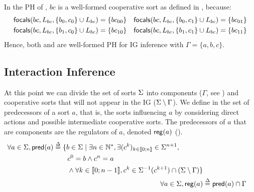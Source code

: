 \begin{example}
In the PH of , $bc$ is a well-formed cooperative sort as defined in , because:
\begin{align*}
\mathsf{focals}(bc, L_{bc}, \{b_0, c_0\} \cup L_{bc}) = \{bc_{00}\} && \mathsf{focals}(bc, L_{bc}, \{b_0, c_1\} \cup L_{bc}) = \{bc_{01}\} \\
\mathsf{focals}(bc, L_{bc}, \{b_1, c_0\} \cup L_{bc}) = \{bc_{10}\} && \mathsf{focals}(bc, L_{bc}, \{b_1, c_1\} \cup L_{bc}) = \{bc_{11}\}
\end{align*}
Hence, both  and  are well-formed PH for IG inference
with $\Gamma = \{a,b,c\}$.
\end{example}



\subsection{Interaction Inference}\label{ssec:infer-IG}

At this point we can divide the set of sorts $\Sigma$ into components ($\Gamma$, see ) and cooperative sorts
that will not appear in the IG ($\Sigma \setminus \Gamma$).
We define in  the set of predecessors of a sort $a$, that is, the sorts influencing $a$
by considering direct actions and possible intermediate cooperative sorts.
The predecessors of $a$ that are components are the regulators of $a$, denoted $\mathsf{reg}({a})$
().
\begin{align}
\begin{split}
\forall a \in \Sigma, \mathsf{pred}(a) &\stackrel{\Delta}= \{b \in \Sigma \mid \exists n \in \mathbb{N}^*, \exists
(c^k)_{k \in \llbracket 0 ; n \rrbracket} \in \Sigma^{n+1}, \\
                                   & \quad \quad c^0 = b \wedge c^n = a \\
                                   & \quad \quad \wedge \forall k \in \llbracket 0 ; n-1 \rrbracket,
                   c^k \in \Sigma^{-1}(c^{k+1}) \cap (\Sigma\setminus\Gamma)\}
\end{split}
\label{eq:ph_predec}
\\
\forall a\in \Sigma, \mathsf{reg}({a}) & \stackrel{\Delta}= \mathsf{pred}(a) \cap \Gamma
\label{eq:regulators}
\end{align}

